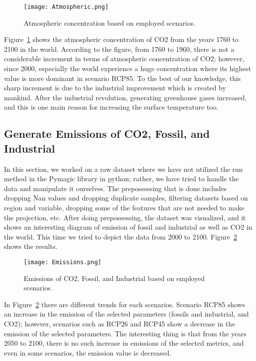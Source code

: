 \documentclass[12pt]{article}
\begin{document}
\begin{figure}[H]
\centering
\texttt{[image: Atmospheric.png]}
\caption{Atmospheric concentration based on employed scenarios.}
\label{fig:atomospheric}
\end{figure}

Figure~\ref{fig:atomospheric} shows the atmospheric concentration of CO2 from the years 1760 to 2100 in the world. According to the figure, from 1760 to 1960, there is not a considerable increment in terms of atmospheric concentration of CO2; however, since 2000, especially the world experience a huge concentration where its highest value is more dominant in scenario RCP85. To the best of our knowledge, this sharp increment is due to the industrial improvement which is created by mankind. After the industrial revolution, generating greenhouse gases increased, and this is one main reason for increasing the surface temperature too.


\subsection{Generate Emissions of CO2, Fossil, and Industrial}
\label{lab:stemp}

In this section, we worked on a raw dataset where we have not utilized the run method in the Pymagic library in python; rather, we have tried to handle the data and manipulate it ourselves. The prepossessing that is done includes dropping Nan values and dropping duplicate samples, filtering datasets based on region and variable, dropping some of the features that are not needed to make the projection, etc. After doing prepossessing, the dataset was visualized, and it shows an interesting diagram of emission of fossil and industrial as well as CO2 in the world. This time we tried to depict the data from 2000 to 2100. Figure~\ref{fig:emission} shows the results.


\begin{figure}[H]
\centering
\texttt{[image: Emissions.png]}
\caption{Emissions of CO2, Fossil, and Industrial based on employed scenarios.}
\label{fig:emission}
\end{figure}

In Figure~\ref{fig:emission} there are different trends for each scenarios. Scenario RCP85 shows an increase in the emission of the selected parameters (fossils and industrial, and CO2); however, scenarios such as RCP26 and RCP45 show a decrease in the emission of the selected parameters. The interesting thing is that from the years 2050 to 2100, there is no such increase in emissions of the selected metrics, and even in some scenarios, the emission value is decreased.
\end{document}
